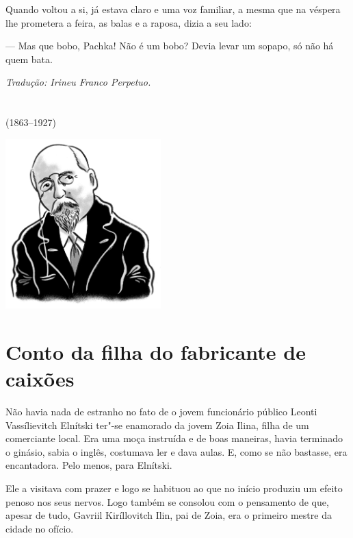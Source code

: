 Quando voltou a si, já estava claro e uma voz familiar, a mesma que na
véspera lhe prometera a feira, as balas e a raposa, dizia a seu lado:

--- Mas que bobo, Pachka! Não é um bobo? Devia levar um sopapo, só não
há quem bata.

\medskip

{\footnotesize\hfill\emph{Tradução: Irineu Franco Perpetuo.}}

\chapter*{}
\label{part8}
\thispagestyle{empty}

\begin{vplace}[1.5]
{\HUGES\hfill{}}

{\LARGE\hfill\textlt(1863–1927)}
\end{vplace}

\pagebreak
\thispagestyle{empty}
\mbox{}
\vfill
\begin{center}
\includegraphics[width=6cm]{./imgs/autor7.jpg}
\end{center}


\chapter{Conto da filha do fabricante de caixões}

Não havia nada de estranho no fato de o jovem funcionário público Leonti
Vassílievitch Elnítski ter"-se enamorado da jovem Zoia Ilina, filha de um
comerciante local. Era uma moça instruída e de boas maneiras, havia
terminado o ginásio, sabia o inglês, costumava ler e dava aulas. E, como
se não bastasse, era encantadora. Pelo menos, para Elnítski.

Ele a visitava com prazer e logo se habituou ao que no início produziu
um efeito penoso nos seus nervos. Logo também se consolou com o
pensamento de que, apesar de tudo, Gavriil Kiríllovitch Ilin, pai de
Zoia, era o primeiro mestre da cidade no ofício.

